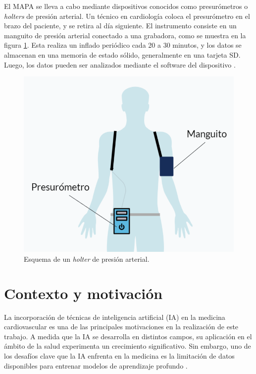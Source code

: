 
El MAPA se lleva a cabo mediante dispositivos conocidos como presurómetros o \textit{holters} de presión arterial. 
Un técnico en cardiología coloca el presurómetro en el brazo del paciente, y se retira al día siguiente. 
El instrumento consiste en un manguito de presión arterial conectado a una grabadora, como se muestra en 
la figura \ref{fig:holter}. Esta realiza un inflado periódico cada 20 a 30 minutos, y los datos se almacenan en una memoria 
de estado sólido, generalmente en una tarjeta SD. Luego, los datos pueden ser analizados mediante el software del 
dispositivo \citep{CITE:3} \citep{CITE:7}.

\begin{figure}[h]
  \centering
  \includegraphics[width=.7\textwidth]{./Figures/presurometro.png}
  \caption{Esquema de un \textit{holter} de presión arterial.}
  \label{fig:holter}
\end{figure}


\section{Contexto y motivación}

La incorporación de técnicas de inteligencia artificial (IA) en la medicina cardiovascular es una de las principales 
motivaciones en la realización de este trabajo. A medida que la IA se desarrolla en distintos campos, su aplicación 
en el ámbito de la salud experimenta un crecimiento significativo. Sin embargo, uno de los desafíos clave que la IA 
enfrenta en la medicina es la limitación de datos disponibles para entrenar modelos de aprendizaje profundo \citep{CITE:8}.

